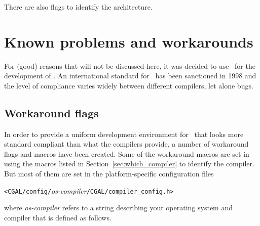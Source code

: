 \noindent There are also flags to identify the architecture.

\vspace{5mm}\vspace{5mm}

\section{Known problems and workarounds}
\label{sec:problems_and_workarounds}

For (good) reasons that will not be discussed here, it was decided to
use \CC\ for the development of \cgal. An international standard for
\CC\ has been sanctioned in 1998 \cite{cgal:ansi-is14882-98} and the
level of compliance varies widely between different
compilers, let alone bugs.

\subsection{Workaround flags}
\label{sec:workaround_flags}

In order to provide a uniform development environment for \cgal\ that
looks more standard compliant than what the compilers provide, a number
of workaround flags and macros have been created.  Some of the
workaround macros are set in 
using the macros 
listed in Section~\ref{sec:which_compiler} to identify the compiler. 
But most of them are set in the platform-specific configuration files
\begin{center}
\texttt{<CGAL/config/}{\em os-compiler}\texttt{/CGAL/compiler\_config.h>}
\end{center}
where \textit{os-compiler} refers to a string describing your
operating system and compiler that is defined as follows.

